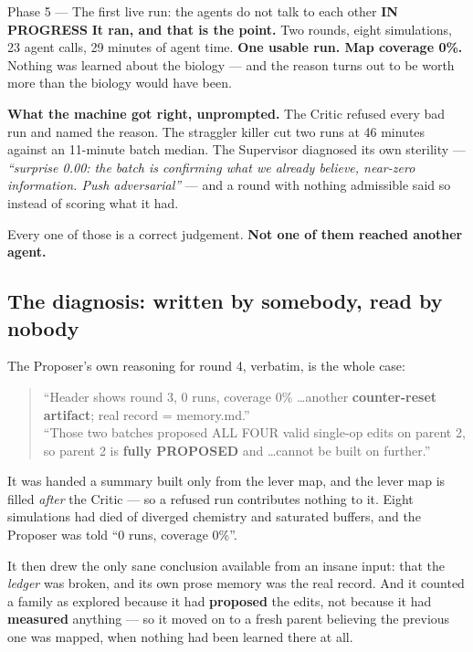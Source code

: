 \documentclass[11pt,a4paper]{article}
\newcommand{\prog}{\textcolor{warn}{\textbf{IN PROGRESS}}}
\begin{document}
\begin{phasebox}{Phase 5 --- The first live run: the agents do not talk to each other \hfill \prog}
\textbf{It ran, and that is the point.} Two rounds, eight simulations, 23 agent calls, 29
minutes of agent time. \textbf{One usable run. Map coverage 0\%.} Nothing was learned about the
biology --- and the reason turns out to be worth more than the biology would have been.

\textbf{What the machine got right, unprompted.} The Critic refused every bad run and named the
reason. The straggler killer cut two runs at 46 minutes against an 11-minute batch median. The
Supervisor diagnosed its own sterility --- \emph{``surprise 0.00: the batch is confirming what we
already believe, near-zero information. Push adversarial''} --- and a round with nothing
admissible said so instead of scoring what it had.

Every one of those is a correct judgement. \textbf{Not one of them reached another agent.}

\subsection*{The diagnosis: written by somebody, read by nobody}

The Proposer's own reasoning for round 4, verbatim, is the whole case:

\begin{quote}\small
``Header shows round 3, 0 runs, coverage 0\% \ldots another \textbf{counter-reset artifact}; real
record = memory.md.''\\[2pt]
``Those two batches proposed ALL FOUR valid single-op edits on parent 2, so parent 2 is
\textbf{fully PROPOSED} and \ldots cannot be built on further.''
\end{quote}

It was handed a summary built only from the lever map, and the lever map is filled \emph{after}
the Critic --- so a refused run contributes nothing to it. Eight simulations had died of diverged
chemistry and saturated buffers, and the Proposer was told ``0 runs, coverage 0\%''.

It then drew the only sane conclusion available from an insane input: that the \emph{ledger} was
broken, and its own prose memory was the real record. And it counted a family as explored because
it had \textbf{proposed} the edits, not because it had \textbf{measured} anything --- so it moved
on to a fresh parent believing the previous one was mapped, when nothing had been learned there
at all.


\end{phasebox}
\end{document}
